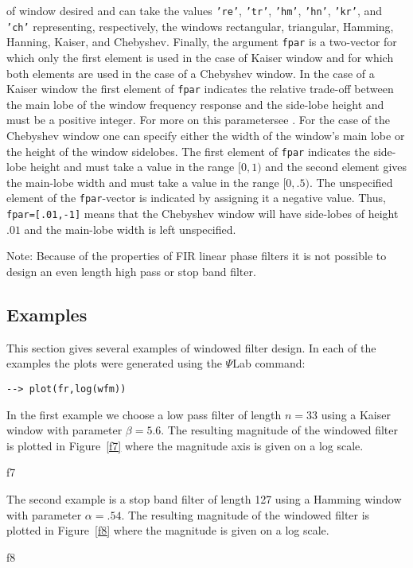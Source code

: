 of window desired and can take the values {\tt 're'}, {\tt 'tr'},
{\tt 'hm'}, {\tt 'hn'}, {\tt 'kr'}, and {\tt 'ch'} representing,
respectively, the windows rectangular, triangular, Hamming, Hanning,
Kaiser, and Chebyshev.  Finally, the argument {\tt fpar} is a two-vector
for which only the first element is used in the case of Kaiser window
and for which both elements are used in the case of a Chebyshev window.
In the case of a Kaiser window the first element of {\tt fpar} 
indicates the relative trade-off between the main lobe of the window
frequency response and the side-lobe height and must be a positive integer.
For more on this parametersee \cite{rabiner}.  For the case of the
Chebyshev window one can specify either the width of the window's main
lobe or the height of the window sidelobes.  The first element of
{\tt fpar} indicates the side-lobe height and must take a value
in the range $[0,1)$ and the second element 
gives the main-lobe width and must take a value in the range $[0,.5)$.
The unspecified element of the {\tt fpar}-vector is indicated by
assigning it a negative value.  Thus, {\tt fpar=[.01,-1]} means
that the Chebyshev window will have side-lobes of height $.01$ and
the main-lobe width is left unspecified.

	Note: Because of the properties of FIR linear phase filters it is
not possible to design an even length high pass or stop band filter.
 
\subsection{Examples}
\label{s5}

	This section gives several examples of windowed filter design.
In each of the examples the plots were generated using the $\Psi$Lab command:
\begin{verbatim}
--> plot(fr,log(wfm))
\end{verbatim}

In the first example we choose a low pass filter of length $n=33$
using a Kaiser window with parameter $\beta=5.6$.  The resulting magnitude
of the windowed filter is 
plotted in Figure~\ref{f7} where the magnitude axis is given on a log scale.
%

{f7}
%

	The second example is a stop band filter of length 127
using a Hamming window with parameter $\alpha=.54$.  The resulting
magnitude of the windowed filter is plotted in Figure~\ref{f8} where
the magnitude is given on a log scale.
%

{f8}
%

